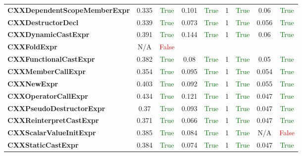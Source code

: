 \documentclass{article}
\begin{document}
\begin{xltabular}{\textwidth}{lcccccccc}
\textbf{{\fontsize{10}{12}\selectfont CXXDependentScopeMemberExpr}}& 0.335&\textcolor{green}{True}& 0.101&\textcolor{green}{True}& 1&\textcolor{green}{True}& 0.06&\textcolor{green}{True} \\[0.5ex]
\textbf{{\fontsize{10}{12}\selectfont CXXDestructorDecl}}& 0.339&\textcolor{green}{True}& 0.073&\textcolor{green}{True}& 1&\textcolor{green}{True}& 0.056&\textcolor{green}{True} \\[0.5ex]
\textbf{{\fontsize{10}{12}\selectfont CXXDynamicCastExpr}}& 0.391&\textcolor{green}{True}& 0.144&\textcolor{green}{True}& 1&\textcolor{green}{True}& 0.06&\textcolor{green}{True} \\[0.5ex]
\textbf{{\fontsize{10}{12}\selectfont CXXFoldExpr}}& N/A&\textcolor{red}{False} \\[0.5ex]
\textbf{{\fontsize{10}{12}\selectfont CXXFunctionalCastExpr}}& 0.382&\textcolor{green}{True}& 0.08&\textcolor{green}{True}& 1&\textcolor{green}{True}& 0.05&\textcolor{green}{True} \\[0.5ex]
\textbf{{\fontsize{10}{12}\selectfont CXXMemberCallExpr}}& 0.354&\textcolor{green}{True}& 0.095&\textcolor{green}{True}& 1&\textcolor{green}{True}& 0.054&\textcolor{green}{True} \\[0.5ex]
\textbf{{\fontsize{10}{12}\selectfont CXXNewExpr}}& 0.403&\textcolor{green}{True}& 0.092&\textcolor{green}{True}& 1&\textcolor{green}{True}& 0.055&\textcolor{green}{True} \\[0.5ex]
\textbf{{\fontsize{10}{12}\selectfont CXXOperatorCallExpr}}& 0.434&\textcolor{green}{True}& 0.121&\textcolor{green}{True}& 1&\textcolor{green}{True}& 0.047&\textcolor{green}{True} \\[0.5ex]
\textbf{{\fontsize{10}{12}\selectfont CXXPseudoDestructorExpr}}& 0.37&\textcolor{green}{True}& 0.093&\textcolor{green}{True}& 1&\textcolor{green}{True}& 0.047&\textcolor{green}{True} \\[0.5ex]
\textbf{{\fontsize{10}{12}\selectfont CXXReinterpretCastExpr}}& 0.371&\textcolor{green}{True}& 0.066&\textcolor{green}{True}& 1&\textcolor{green}{True}& 0.047&\textcolor{green}{True} \\[0.5ex]
\textbf{{\fontsize{10}{12}\selectfont CXXScalarValueInitExpr}}& 0.385&\textcolor{green}{True}& 0.084&\textcolor{green}{True}& 1&\textcolor{green}{True}& N/A&\textcolor{red}{False} \\[0.5ex]
\textbf{{\fontsize{10}{12}\selectfont CXXStaticCastExpr}}& 0.384&\textcolor{green}{True}& 0.074&\textcolor{green}{True}& 1&\textcolor{green}{True}& 0.047&\textcolor{green}{True} \\[0.5ex]

\end{xltabular}
\end{document}
